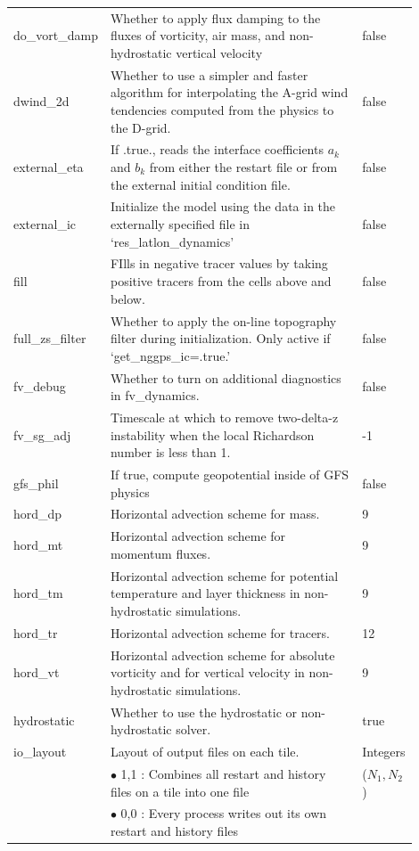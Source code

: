 \documentclass[11pt,fleqn]{report}              %
\begin{document}
\begin{enumerate}
{\begin{longtable}{p{0.13\linewidth} | p{0.69\linewidth} | p{0.08\linewidth} }
 do\_vort\_damp & Whether to apply flux damping to the fluxes of vorticity, air mass, and non-hydrostatic vertical velocity & false \\
 dwind\_2d & Whether to use a simpler and faster algorithm for interpolating the A-grid wind tendencies computed from the physics to the D-grid. & false \\
 external\_eta & If .true., reads the interface coefficients $a_k$ and $b_k$ from either the restart file or from the external initial condition file. & false \\
 external\_ic & Initialize the model using the data in the externally specified file in `res\_latlon\_dynamics' & false \\
 fill & FIlls in negative tracer values by taking positive tracers from the cells above and below. & false \\
 full\_zs\_filter & Whether to apply the on-line topography filter during initialization. Only active if `get\_nggps\_ic=.true.' & false \\
 fv\_debug & Whether to turn on additional diagnostics in fv\_dynamics. & false \\
 fv\_sg\_adj & Timescale at which to remove two-delta-z instability when the local Richardson number is less than 1. & -1 \\
 gfs\_phil & If true, compute geopotential inside of GFS physics  & false \\
 hord\_dp & Horizontal advection scheme for mass. & 9 \\
 hord\_mt & Horizontal advection scheme for momentum fluxes. & 9 \\
 hord\_tm & Horizontal advection scheme for potential temperature and layer thickness in non-hydrostatic simulations. & 9 \\
 hord\_tr & Horizontal advection scheme for tracers. & 12 \\
 hord\_vt & Horizontal advection scheme for absolute vorticity and for vertical velocity in non-hydrostatic simulations. & 9 \\
 hydrostatic & Whether to use the hydrostatic or non-hydrostatic solver. & true \\
 io\_layout & Layout of output files on each tile.  & Integers  \\
  & $\bullet$ 1,1 : Combines all restart and history files on a tile into one file & ($N_1,N_2$) \\
  & $\bullet$ 0,0 : Every process writes out its own restart and history files & \\

\end{longtable}}
\end{enumerate}
\end{document}
